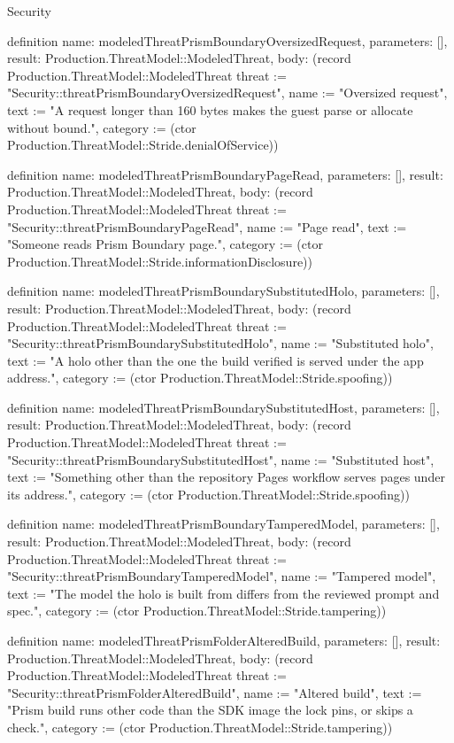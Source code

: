\begin{lexlean}{Security}
\begin{semanticmodule}
definition{
  name: modeledThreatPrismBoundaryOversizedRequest,
  parameters: [],
  result: Production.ThreatModel::ModeledThreat,
  body: (record Production.ThreatModel::ModeledThreat {threat := "Security::threatPrismBoundaryOversizedRequest", name := "Oversized request", text := "A request longer than 160 bytes makes the guest parse or allocate without bound.", category := (ctor Production.ThreatModel::Stride.denialOfService)})
}

definition{
  name: modeledThreatPrismBoundaryPageRead,
  parameters: [],
  result: Production.ThreatModel::ModeledThreat,
  body: (record Production.ThreatModel::ModeledThreat {threat := "Security::threatPrismBoundaryPageRead", name := "Page read", text := "Someone reads Prism Boundary page.", category := (ctor Production.ThreatModel::Stride.informationDisclosure)})
}

definition{
  name: modeledThreatPrismBoundarySubstitutedHolo,
  parameters: [],
  result: Production.ThreatModel::ModeledThreat,
  body: (record Production.ThreatModel::ModeledThreat {threat := "Security::threatPrismBoundarySubstitutedHolo", name := "Substituted holo", text := "A holo other than the one the build verified is served under the app address.", category := (ctor Production.ThreatModel::Stride.spoofing)})
}

definition{
  name: modeledThreatPrismBoundarySubstitutedHost,
  parameters: [],
  result: Production.ThreatModel::ModeledThreat,
  body: (record Production.ThreatModel::ModeledThreat {threat := "Security::threatPrismBoundarySubstitutedHost", name := "Substituted host", text := "Something other than the repository Pages workflow serves pages under its address.", category := (ctor Production.ThreatModel::Stride.spoofing)})
}

definition{
  name: modeledThreatPrismBoundaryTamperedModel,
  parameters: [],
  result: Production.ThreatModel::ModeledThreat,
  body: (record Production.ThreatModel::ModeledThreat {threat := "Security::threatPrismBoundaryTamperedModel", name := "Tampered model", text := "The model the holo is built from differs from the reviewed prompt and spec.", category := (ctor Production.ThreatModel::Stride.tampering)})
}

definition{
  name: modeledThreatPrismFolderAlteredBuild,
  parameters: [],
  result: Production.ThreatModel::ModeledThreat,
  body: (record Production.ThreatModel::ModeledThreat {threat := "Security::threatPrismFolderAlteredBuild", name := "Altered build", text := "Prism build runs other code than the SDK image the lock pins, or skips a check.", category := (ctor Production.ThreatModel::Stride.tampering)})
}


\end{semanticmodule}
\end{lexlean}
